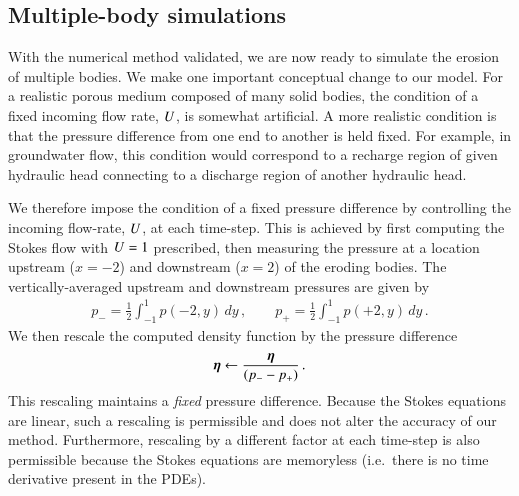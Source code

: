 \documentclass[preprint, 10pt]{elsarticle}
\begin{document}
\subsection{Multiple-body simulations}

With the numerical method validated, we are now ready to simulate the erosion of multiple bodies. We make one important conceptual change to our model. For a realistic porous medium composed of many solid bodies, the condition of a fixed incoming flow rate, $U$, is somewhat artificial. A more realistic condition is that the pressure difference from one end to another is held fixed. For example, in groundwater flow, this condition would correspond to a recharge region of given hydraulic head connecting to a discharge region of another hydraulic head. 

We therefore impose the condition of a fixed pressure difference by controlling the incoming flow-rate, $U$, at each time-step. This is achieved by first computing the Stokes flow with $U = 1$ prescribed, then measuring the pressure at a location upstream ($x = -2$) and downstream ($x=2$) of the eroding bodies. The vertically-averaged upstream and downstream pressures are given by
\begin{align}
p_{-} = \frac{1}{2} \int_{-1}^{1} p(-2,y) \, dy \, , \qquad
p_{+} = \frac{1}{2} \int_{-1}^{1} p(+2,y) \, dy \, .
\end{align}
We then rescale the computed density function by the pressure difference
\begin{align}
{\boldsymbol\eta} \leftarrow \frac{{\boldsymbol\eta}}{(p_{-} - p_{+})} \, .
\end{align}
This rescaling maintains a {\em fixed} pressure difference. Because the Stokes equations are linear, such a rescaling is permissible and does not alter the accuracy of our method. Furthermore, rescaling by a different factor at each time-step is also permissible because the Stokes equations are memoryless (i.e.~there is no time derivative present in the PDEs).
\end{document}
